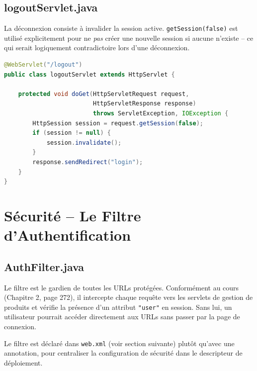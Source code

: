 \documentclass[12pt, a4paper]{article}
\begin{document}
\subsection{logoutServlet.java}

La déconnexion consiste à invalider la session active. \texttt{getSession(false)} est utilisé explicitement pour ne \emph{pas} créer une nouvelle session si aucune n'existe -- ce qui serait logiquement contradictoire lors d'une déconnexion.

\begin{lstlisting}[language=Java, style=javastyle, caption=web/logoutServlet.java]
@WebServlet("/logout")
public class logoutServlet extends HttpServlet {

    protected void doGet(HttpServletRequest request,
                         HttpServletResponse response)
                         throws ServletException, IOException {
        HttpSession session = request.getSession(false);
        if (session != null) {
            session.invalidate();
        }
        response.sendRedirect("login");
    }
}
\end{lstlisting}

\section{Sécurité -- Le Filtre d'Authentification}

\subsection{AuthFilter.java}

Le filtre est le gardien de toutes les URLs protégées. Conformément au cours (Chapitre 2, page 272), il intercepte chaque requête vers les servlets de gestion de produits et vérifie la présence d'un attribut \texttt{"user"} en session. Sans lui, un utilisateur pourrait accéder directement aux URLs sans passer par la page de connexion.

Le filtre est déclaré dans \texttt{web.xml} (voir section suivante) plutôt qu'avec une annotation, pour centraliser la configuration de sécurité dans le descripteur de déploiement.
\end{document}
